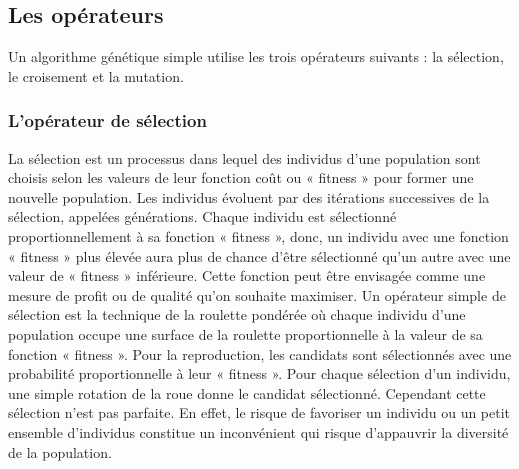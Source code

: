 	\newpage
	
	\subsection{Les opérateurs}
		Un algorithme génétique simple utilise les trois opérateurs suivants : la sélection, le croisement et la mutation.
		\subsubsection{L’opérateur de sélection}
		La sélection est un processus dans lequel des individus d’une population sont choisis selon les valeurs de leur fonction coût ou «  fitness  » pour former une nouvelle population. Les individus évoluent par des itérations successives de la sélection, appelées générations. Chaque individu est sélectionné proportionnellement à sa fonction « fitness », donc, un individu avec une fonction « fitness »
plus élevée aura plus de chance d’être sélectionné qu’un autre avec une valeur de « fitness » inférieure. Cette fonction peut être envisagée comme une mesure de profit ou de qualité qu’on souhaite maximiser. Un opérateur simple de sélection est la technique de la roulette pondérée où chaque individu d’une population
occupe une surface de la roulette proportionnelle à la valeur de sa fonction « fitness ». Pour la reproduction, les candidats sont sélectionnés avec une probabilité proportionnelle à leur «  fitness  ». Pour chaque sélection d’un
individu, une simple rotation de la roue donne le candidat sélectionné. Cependant cette sélection n’est pas parfaite. En effet, le risque de favoriser un individu ou un petit ensemble d’individus constitue un inconvénient qui risque d’appauvrir la diversité de la population.
